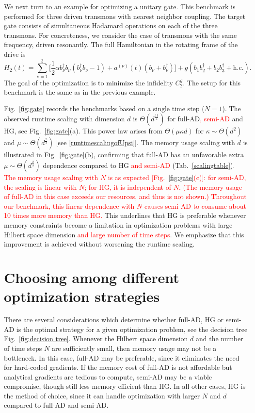 \documentclass[letterpaper,10pt]{iopart}
\newcommand\revise[1]{\textcolor{red}{#1}}
\begin{document}
We next turn to an example for optimizing a unitary gate. This benchmark is performed for three driven transmons with nearest neighbor coupling. The target gate consists of simultaneous Hadamard operations on each of the three transmons. For concreteness, we consider the case of transmons with the same frequency, driven resonantly. The full Hamiltonian in the rotating frame of the drive is
\begin{equation}
\label{gateH}
    H_2(t)=\sum_{\nu=1}^{3}\bigg[\frac{1}{2}\alpha b_\nu^\dagger b_\nu (b_\nu^\dagger b_\nu-1)+a^{(\nu)}(t)(b_\nu+b_\nu^\dagger)\bigg]+g(b_1b_{2}^\dagger+b_2b_{3}^\dagger+\text{h.c.}).
\end{equation}
The goal of the optimization is to minimize the infidelity $C_2^{ g}$. The setup for this benchmark is the same as in the previous example.



Fig.\ \ref{fig:gate} records the  benchmarks based on a single time step ($N=1$). The observed runtime scaling with dimension $d$ is $\Theta(d^{\frac{11}{3}})$ for full-AD\revise{, semi-AD} and HG, see Fig.\ \ref{fig:gate}(a). This power law arises from $\Theta(\mu\kappa d)$ for $\kappa\sim \Theta(d^2)$ and $\mu\sim \Theta(d^{\frac{2}{3}})$ [see   \ref{runtimescalingofUpsi}]. The memory usage scaling with $d$ is illustrated in Fig.\ \ref{fig:gate}(b), confirming that full-AD has an unfavorable extra $\mu \sim \Theta(d^{\frac{2}{3}})$ dependence compared to HG \revise{and semi-AD} (Tab.\  \ref{scalingtable}). \revise{The memory usage scaling with $N$ is as expected [Fig.\ \ref{fig:gate}(c)]: for semi-AD, the scaling is linear with $N$; for HG, it is independent of $N$. (The memory usage of full-AD in this case exceeds our resources, and thus is not shown.) Throughout our benchmark, this linear dependence with $N$ causes semi-AD to consume about 10 times more memory than HG. }This underlines that HG is preferable whenever memory constraints become a limitation in optimization problems with large Hilbert space dimension \revise{and large number of time steps}. We emphasize that this improvement is achieved without worsening the runtime scaling. 


\section{Choosing among different optimization strategies }
\label{Decision tree}
There are several considerations which determine whether full-AD, HG or semi-AD is the optimal strategy for a given optimization problem, see the decision tree Fig.\ \ref{fig:decision tree}. Whenever the Hilbert space dimension $d$ and the number of time steps $N$ are sufficiently small, then memory usage may not be a bottleneck. In this case, full-AD may be preferable, since it eliminates the need for hard-coded gradients. If the memory cost of full-AD is not affordable but analytical gradients are tedious to compute, semi-AD may be a viable compromise, though still less memory efficient than HG. In all other cases, HG is the method of choice, since it can handle optimization with larger $N$ and $d$ compared to full-AD and semi-AD. 
\end{document}
